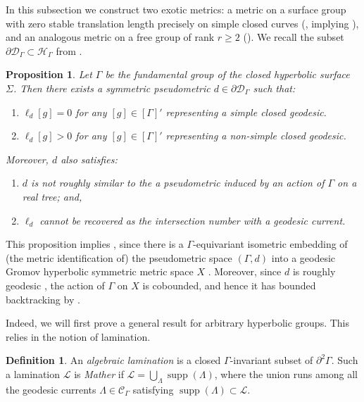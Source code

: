 \documentclass[twoside]{amsart}
\newtheorem{proposition}[theorem]{Proposition}
\theoremstyle{definition}
\newtheorem{definition}[theorem]{Definition}
\numberwithin{equation}{section}
\numberwithin{theorem}{section}
\newcommand{\calC}{\mathcal{C}}
\newcommand{\calD}{\mathcal{D}}
\newcommand{\calH}{\mathcal{H}}
\newcommand{\calL}{\mathcal{L}}
\newcommand{\G}{\Gamma}
\newcommand{\Lam}{\Lambda}
\newcommand{\Sig}{\Sigma}
\DeclareMathOperator{\supp}{supp}
\newcommand{\ppG}{\partial^2 \G}
\begin{document}
In this subsection we construct two exotic metrics: a metric on a surface group with zero stable translation length precisely on simple closed curves (, implying ), and an analogous metric on a free group of rank $r \geq 2$ (). We recall the subset $\partial \calD_\G \subset \calH_\G$ from .



\begin{proposition}\label{prop:positiveonnonsimple}
    Let $\G$ be the fundamental group of the closed hyperbolic surface $\Sig$. Then there exists a symmetric pseudometric $d\in \partial \calD_\G$ such that:
    \begin{enumerate}
        \item $\ell_{d}[g]=0$ for any $[g]\in [\G]'$ representing a simple closed geodesic.
        \item $\ell_{d}[g]>0$ for any $[g]\in [\G]'$ representing a non-simple closed geodesic.
\end{enumerate}
Moreover, $d$ also satisfies:
\begin{enumerate}
 \item[(3)] $d$ is not roughly similar to the a pseudometric induced by an action of $\G$ on a real tree; and,
\item[(4)] $\ell_{d}$ cannot be recovered as  the intersection number with a geodesic current.
\end{enumerate}
\end{proposition}

This proposition implies , since there is a $\G$-equivariant isometric embedding of (the metric identification of) the pseudometric space $(\G,d)$ into a geodesic Gromov hyperbolic symmetric metric space $X$ \cite{lang}. Moreover, since $d$ is roughly geodesic \cite[Lemma~6.2]{cantrell-reyes.manhattan}, the action of $\G$ on $X$ is cobounded, and hence it has bounded backtracking by \cite[Lemma~6.3]{cantrell-reyes.manhattan}.

Indeed, we will first prove a general result for arbitrary hyperbolic groups. This relies in the notion of lamination.

\begin{definition}
    An \emph{algebraic lamination} is a closed $\G$-invariant subset of $\ppG$. Such a lamination  $\calL$ is \emph{Mather} if $\calL=\bigcup_{\Lam}\supp(\Lam)$, where the union runs among all the geodesic currents $\Lam \in \calC_\G$ satisfying $\supp(\Lam) \subset \calL$.
\end{definition}
\end{document}
